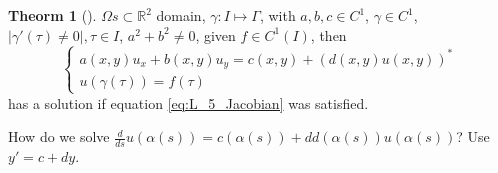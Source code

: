 \documentclass[a4paper]{article}
\theoremstyle{definition}
\newtheorem{theorem}{Theorm}[section]
\begin{document}
	\begin{theorem}[]
		$\Omega s\subset \mathbb{R}^2$ domain, $\gamma:I \mapsto \Gamma$, with $a,b,c\in C^{1}$, $\gamma\in C^{1}$, $\left|\gamma'\left( \tau \right) \neq 0 \right|, \tau\in I $, $a^2+b^2\neq 0$, given $f\in C^{1}\left( I \right) $, then
		\begin{equation}
			\begin{cases}
				a\left( x,y \right) u_{x}+b\left( x,y \right) u_{y}=c\left( x,y \right) +\left( d\left( x,y \right) u\left( x,y \right)  \right) ^{*}\\
				u\left( \gamma\left( \tau \right)  \right) =f\left( \tau \right) 
			\end{cases}
		\end{equation} 
		has a solution if equation \ref{eq:L_5_Jacobian} was satisfied. 
	\end{theorem}
	How do we solve $\frac{d}{ds}u\left( \alpha\left( s \right)  \right) =c\left( \alpha\left( s \right)  \right) +dd\left( \alpha\left( s \right)  \right) u\left( \alpha\left( s \right)  \right) $? Use $y'=c+dy$. 
\end{document}
